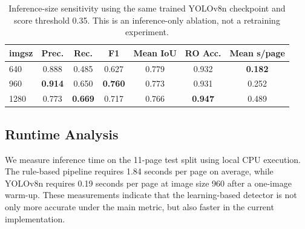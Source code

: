 \documentclass[12pt]{article}
\begin{document}
\begin{table}[t]
\centering
\caption{Inference-size sensitivity using the same trained YOLOv8n checkpoint and score threshold 0.35. This is an inference-only ablation, not a retraining experiment.}
\label{tab:imgsz_ablation}
\begin{tabular}{lcccccc}
\toprule
imgsz & Prec. & Rec. & F1 & Mean IoU & RO Acc. & Mean s/page \\
\midrule
640 & 0.888 & 0.485 & 0.627 & 0.779 & 0.932 & \textbf{0.182} \\
960 & \textbf{0.914} & 0.650 & \textbf{0.760} & 0.773 & 0.931 & 0.252 \\
1280 & 0.773 & \textbf{0.669} & 0.717 & 0.766 & \textbf{0.947} & 0.489 \\
\bottomrule
\end{tabular}
\end{table}

\subsection{Runtime Analysis}
We measure inference time on the 11-page test split using local CPU execution. The rule-based pipeline requires 1.84 seconds per page on average, while YOLOv8n requires 0.19 seconds per page at image size 960 after a one-image warm-up. These measurements indicate that the learning-based detector is not only more accurate under the main metric, but also faster in the current implementation.

\begin{table}[t]
\centering
\caption{Runtime on the 11-page test split under local CPU execution.}
\label{tab:runtime}
\end{table}
\end{document}
